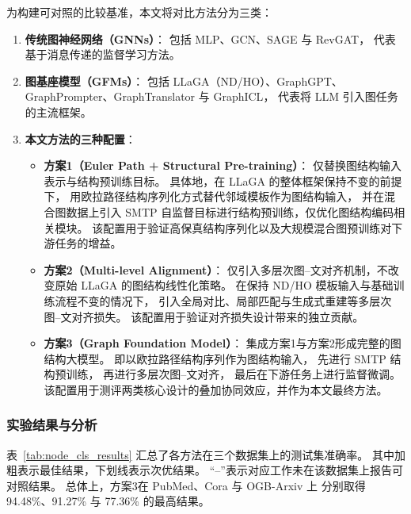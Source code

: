 为构建可对照的比较基准，本文将对比方法分为三类：
\begin{enumerate}
  \item \textbf{传统图神经网络（GNNs）}：
  包括 MLP、GCN\cite{Kipf2016SemiSupervisedCW}、SAGE\cite{Sun2021ScalableAA} 与 RevGAT\cite{Li2024SimilaritybasedNS}，
  代表基于消息传递的监督学习方法。

  \item \textbf{图基座模型（GFMs）}：
  包括 LLaGA（ND/HO）\cite{Chen2024LLaGALL}、GraphGPT\cite{Tang2023GraphGPTGI}、
  GraphPrompter\cite{Lv2025GraphPrompterMA}、GraphTranslator\cite{Zhang2024GraphTranslatorAG} 与 GraphICL\cite{Sun2025GraphICLUG}，
  代表将 LLM 引入图任务的主流框架。

  \item \textbf{本文方法的三种配置}：
  \begin{itemize}
    \item \textbf{方案1（Euler Path + Structural Pre-training）}：
    仅替换图结构输入表示与结构预训练目标。
    具体地，在 LLaGA\cite{Chen2024LLaGALL} 的整体框架保持不变的前提下，
    用欧拉路径结构序列化方式替代邻域模板作为图结构输入，
    并在混合图数据上引入 SMTP 自监督目标进行结构预训练，仅优化图结构编码相关模块。
    该配置用于验证高保真结构序列化以及大规模混合图预训练对下游任务的增益。
    
    \item \textbf{方案2（Multi-level Alignment）}：
    仅引入多层次图--文对齐机制，不改变原始 LLaGA 的图结构线性化策略。
    在保持 ND/HO 模板输入与基础训练流程不变的情况下，
    引入全局对比、局部匹配与生成式重建等多层次图--文对齐损失。
    该配置用于验证对齐损失设计带来的独立贡献。
    \item \textbf{方案3（Graph Foundation Model）}：
    集成方案1与方案2形成完整的图结构大模型。
    即以欧拉路径结构序列作为图结构输入，
    先进行 SMTP 结构预训练，
    再进行多层次图--文对齐，
    最后在下游任务上进行监督微调。
    该配置用于测评两类核心设计的叠加协同效应，并作为本文最终方法。
  \end{itemize}
\end{enumerate}

\subsubsection{实验结果与分析}

表~\ref{tab:node_cls_results} 汇总了各方法在三个数据集上的测试集准确率。
其中加粗表示最佳结果，下划线表示次优结果。
“--”表示对应工作未在该数据集上报告可对照结果。
总体上，方案3在 PubMed、Cora 与 OGB-Arxiv 上
分别取得 94.48\%、91.27\% 与 77.36\% 的最高结果。

